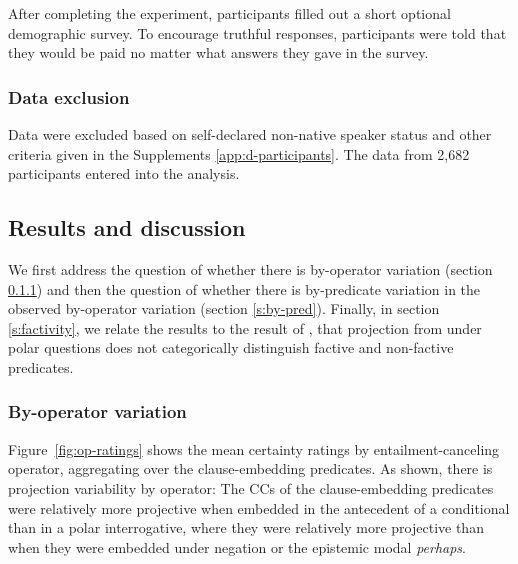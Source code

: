 \documentclass[a4paper,12pt,twoside]{article}
\newcommand{\posscite}[1]{\citeauthor{#1}'s (\citeyear{#1})}
\begin{document}
            After completing the experiment, participants filled out a short optional demographic survey. To encourage truthful responses, participants were told that they would be paid no matter what answers they gave in the survey.

        \subsubsection{Data exclusion}
            Data were excluded based on self-declared non-native speaker status and other criteria given in the Supplements \ref{app:d-participants}. The data from 2,682 participants entered into the analysis.

    \subsection{Results and discussion}

        We first address the question of whether there is by-operator variation (section \ref{s:by-op}) and then the question of whether there is by-predicate variation in the observed by-operator variation (section \ref{s:by-pred}). Finally, in section \ref{s:factivity}, we relate the results to the result of \citealt{degen_are_2022}, that projection from under polar questions does not categorically distinguish factive and non-factive predicates.
    
		
	\subsubsection{By-operator variation}\label{s:by-op}

        Figure~\ref{fig:op-ratings} shows the mean certainty ratings by entailment-canceling operator, aggregating over the clause-embedding predicates. As shown, there is projection variability by operator: The CCs of the clause-embedding predicates were relatively more projective when embedded in the antecedent of a conditional than in a polar interrogative, where they were relatively more projective than when they were embedded under negation or the epistemic modal {\em perhaps}.
        
\end{document}
